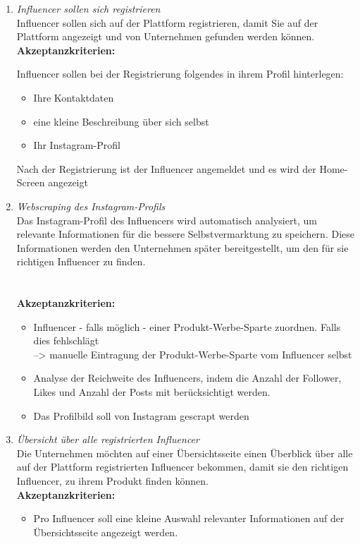 \documentclass[conference,a4paper,flushend]{cs-techrep}
\begin{document}
\begin{enumerate}
\item{\textit{Influencer sollen sich registrieren}\\
 Influencer sollen sich auf der Plattform registrieren, damit Sie auf der Plattform angezeigt und von Unternehmen gefunden werden können.\\
 \textbf{Akzeptanzkriterien:}

Influencer sollen bei der Registrierung folgendes in ihrem Profil hinterlegen:
\begin{itemize}
\item{Ihre Kontaktdaten}
\item{eine kleine Beschreibung über sich selbst}
\item{Ihr Instagram-Profil}
\end{itemize}
Nach der Registrierung ist der Influencer angemeldet und es wird der Home-Screen angezeigt\\}



\item{\textit{Webscraping des Instagram-Profils}\\
Das Instagram-Profil des Influencers wird automatisch analysiert, um relevante Informationen für die bessere Selbstvermarktung zu speichern. Diese Informationen werden den Unternehmen später bereitgestellt, um den für sie richtigen Influencer zu finden. \\
\\
\\
\textbf{Akzeptanzkriterien:}
\begin{itemize}
\item{Influencer - falls möglich - einer Produkt-Werbe-Sparte zuordnen. Falls dies fehlschlägt\\
--> manuelle Eintragung der Produkt-Werbe-Sparte vom Influencer selbst}
\item{Analyse der Reichweite des Influencers, indem die Anzahl der Follower, Likes und Anzahl der Posts mit berücksichtigt werden.}
\item{Das Profilbild soll von Instagram gescrapt werden\\}
\end{itemize}}

\item{\textit{Übersicht über alle registrierten Influencer}\\
Die Unternehmen möchten auf einer Übersichtsseite einen Überblick über alle auf der Plattform registrierten Influencer bekommen, damit sie den richtigen Influencer, zu ihrem Produkt finden können. \\
 \textbf{Akzeptanzkriterien:}
\begin{itemize}
\item{Pro Influencer soll eine kleine Auswahl relevanter Informationen auf der Übersichtsseite angezeigt werden.}


\end{itemize}}
\end{enumerate}
\end{document}
